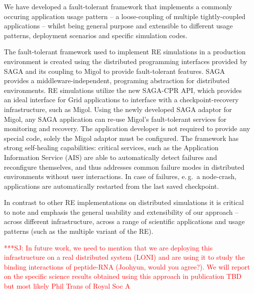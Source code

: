 \documentclass[times, 10pt, twocolumn]{article}
\newcommand{\jhanote}[1]{ {\textcolor{red} { ***SJ: #1 }}}
\newcommand{\jhanote}[1]{}
\begin{document}

We have developed a fault-tolerant framework that implements a
commonly occuring application usage pattern -- a loose-coupling of
multiple tightly-coupled applications -- whilst being general purpose
and extensible to different usage patterns, deployment scenarios and
specific simulation codes.

The fault-tolerant framework used to implement RE simulations in a
production environment is created using the distributed programming
interfaces provided by SAGA and its coupling to Migol to provide
fault-tolerant features.  SAGA provides a middleware-independent,
programing abstraction for distributed environments. RE simulations
utilize the new SAGA-CPR API, which provides an ideal interface for
Grid applications to interface with a checkpoint-recovery
infrastructure, such as Migol. Using the newly developed SAGA adaptor
for Migol, any SAGA application can re-use Migol's fault-tolerant
services for monitoring and recovery.  The application developer is
not required to provide any special code, solely the Migol adaptor
must be configured.  The framework has strong self-healing
capabilities: critical services, such as the Application Information
Service (AIS) are able to automatically detect failures and
reconfigure themselves, and thus addresses common failure modes in
distributed environments without user interactions.
In case of failures, e.\,g.\ a node-crash, applications are
automatically restarted from the last saved
checkpoint. %

In contrast to other RE implementations on distributed
simulations it is critical to note and emphasis the general usability
and extensibility of our approach -- across different infrastructure,
across a range of scientific applications and usage patterns (such as
the multiple variant of the RE).

\jhanote{In future work, we need to mention that we are deploying this
  infrastructure on a real distributed system (LONI) and are using it
  to study the binding interactions of peptide-RNA (Joohyun, would you
  agree?). We will report on the specific science results obtained
  using this approach in publication TBD but most likely Phil Trans of
  Royal Soc A}
\end{document}
